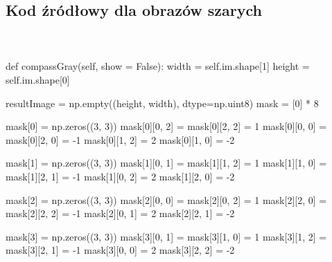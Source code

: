 \documentclass[final,a4paper,openany,12pt]{mwbk}
\begin{document}
\subsection*{Kod źródłowy dla obrazów szarych}
\hfill
\\\\
\noindent def compassGray(self, show = False): \newline
\indent width = self.im.shape[1] \newline
\indent height = self.im.shape[0] \newline

resultImage = np.empty((height, width), dtype=np.uint8) \newline
\indent mask = [0] * 8 \newline

mask[0] = np.zeros((3, 3)) \newline
\indent mask[0][0, 2] = mask[0][2, 2] = 1 \newline
\indent mask[0][0, 0] = mask[0][2, 0] = -1 \newline
\indent mask[0][1, 2] = 2 \newline
\indent mask[0][1, 0] = -2 \newline

mask[1] = np.zeros((3, 3)) \newline
\indent mask[1][0, 1] = mask[1][1, 2] = 1 \newline
\indent mask[1][1, 0] = mask[1][2, 1] = -1 \newline
\indent mask[1][0, 2] = 2 \newline
\indent mask[1][2, 0] = -2 \newline

mask[2] = np.zeros((3, 3)) \newline
\indent mask[2][0, 0] = mask[2][0, 2] = 1 \newline
\indent mask[2][2, 0] = mask[2][2, 2] = -1 \newline
\indent mask[2][0, 1] = 2 \newline
\indent mask[2][2, 1] = -2 \newline

mask[3] = np.zeros((3, 3)) \newline
\indent mask[3][0, 1] = mask[3][1, 0] = 1 \newline
\indent mask[3][1, 2] = mask[3][2, 1] = -1 \newline
\indent \indent \indent mask[3][0, 0] = 2 \newline
\indent \indent \indent mask[3][2, 2] = -2 \newline
\end{document}
